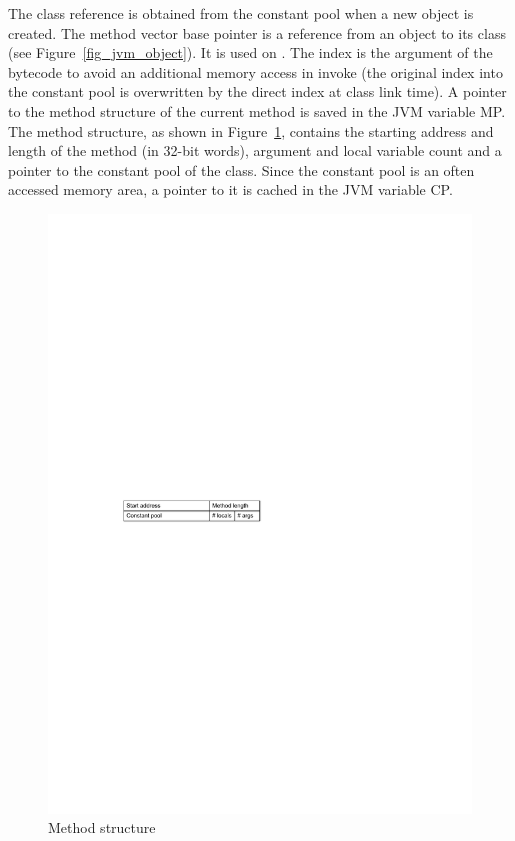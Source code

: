 The class reference is obtained from the constant pool when a new
object is created. The method vector base pointer is a reference from
an object to its class (see Figure~\ref{fig_jvm_object}). It is used
on . The index is the argument of the bytecode to
avoid an additional memory access in invoke (the original index into
the constant pool is overwritten by the direct index at class link
time). A pointer to the method structure of the current method is
saved in the JVM variable MP. The method structure, as shown in
Figure~\ref{fig_jvm_method}, contains the starting address and length
of the method (in 32-bit words), argument and local variable count
and a pointer to the constant pool of the class. Since the constant
pool is an often accessed memory area, a pointer to it is cached in
the JVM variable CP.

\begin{figure}
    \centering
    \includegraphics[scale=\picscale]{jvm/jvm_method}
    \caption{Method structure}
    \label{fig_jvm_method}
\end{figure}


